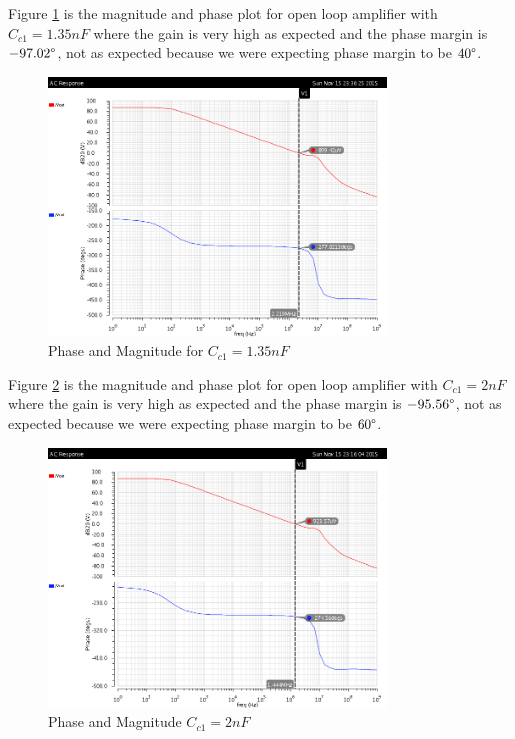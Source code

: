 \documentclass[a4paper,english,11pt]{article}
\begin{document}
Figure \ref{pm40check} is the magnitude and phase plot for open loop amplifier with $C_{c1} = 1.35nF$ where the gain is very high as expected and the phase margin is $-97.02\degree$, not as expected because  we were expecting phase margin to be $40\degree$.
\begin{figure}[H]
 \centering
  \includegraphics[width=0.8\textwidth]{img/cad_pm/pm_135nF.png}
  \caption{Phase and Magnitude for $C_{c1} = 1.35nF$}
  \label{pm40check}	
\end{figure}

Figure \ref{pm60check} is the magnitude and phase plot for open loop amplifier with $C_{c1} = 2nF$ where the gain is very high as expected and the phase margin is $-95.56\degree$, not as expected because  we were expecting phase margin to be $60\degree$.
\begin{figure}[H]
 \centering
  \includegraphics[width=0.8\textwidth]{img/cad_pm/pm_2nF.png}
  \caption{Phase and Magnitude $C_{c1} = 2nF$}
  \label{pm60check}	
\end{figure}
\end{document}
